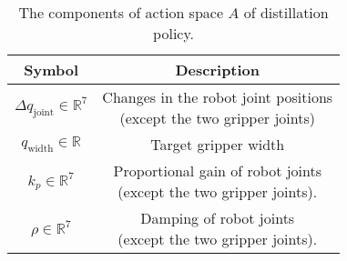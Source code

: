 
\begin{table}[h!]
\centering
\setlength\tabcolsep{20 pt}
\begin{tabular}{|c|c|}
\hline
 \textbf{Symbol} & \textbf{Description} \\
\hline
$\Delta q_\text{joint} \in \mathbb{R}^7$ & \makecell{Changes in the robot joint positions \\ (except the two gripper joints)}  \\
\hline
 $q_\text{width} \in \mathbb{R}$ & Target gripper width  \\
\hline
 $k_p \in \mathbb{R}^{7}$ & \makecell{Proportional gain of robot joints \\ (except the two gripper joints).} \\
 \hline
 $\rho \in \mathbb{R}^{7}$ & \makecell{Damping of robot joints \\ (except the two gripper joints).} \\
\hline
\end{tabular}
\vspace{-0.2cm}
\begin{flushleft}
\footnotesize
\caption{The components of action space $A$ of distillation policy.}\label{table:IL_action}
\end{flushleft}
\vspace{-0.6cm}
\end{table}
